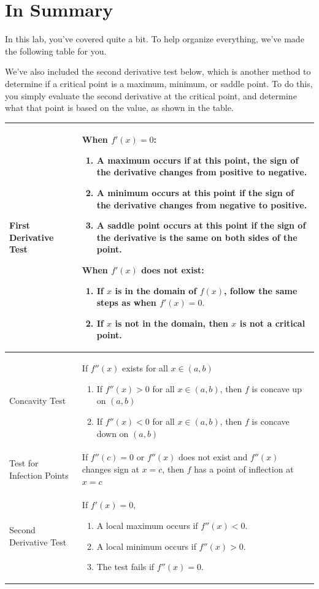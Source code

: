 \documentclass{ximera}
\begin{document}
\section{In Summary}
In this lab, you've covered quite a bit. To help organize everything, we've made the following table for you.

We've also included the second derivative test below, which is another method to determine if a critical point is a maximum, minimum, or saddle point. To do this, you simply evaluate the second derivative at the critical point, and determine what that point is based on the value, as shown in the table.

\begin{tabular}{| l | p{7.5cm} |}
\hline
First Derivative Test & When $f'(x) = 0$: \begin{enumerate}
\item{A maximum occurs if at this point, the sign of the derivative changes from positive to negative.}
\item{A minimum occurs at this point if the sign of the derivative changes from negative to positive.}
\item{A saddle point occurs at this point if the sign of the derivative is the same on both sides of the point.}
\end{enumerate}
When $f'(x)$ does not exist:
\begin{enumerate}
\item{If $x$ is in the domain of $f(x)$, follow the same steps as when $f'(x)=0\text{.}$}
\item{If $x$ is not in the domain, then $x$ is not a critical point.}
\end{enumerate}\\
\hline
Concavity Test &  If $f''(x)$ exists for all $x\in(a,b)$ \begin{enumerate}
\item{If $f''(x)>0$ for all $x\in(a,b)$, then $f$ is concave up on $(a,b)$}
\item{If $f''(x)<0$ for all $x\in(a,b)$, then $f$ is concave down on $(a,b)$}
\end{enumerate}\\
\hline
Test for Infection Points &  If $f''(c)=0$ or $f''(x)$ does not exist and $f''(x)$ changes sign at $x=c$, then $f$ has a point of inflection at $x=c$\\
\hline
Second Derivative Test &  \hspace{5mm}If $f'(x)=0\text{,}$ \begin{enumerate}
\item{A local maximum occurs if $f''(x)<0$.}
\item{A local minimum occurs if $f''(x)>0$.}
\item{The test fails if $f''(x)=0$.}
\end{enumerate}\\ \hline
\end{tabular}
\end{document}
